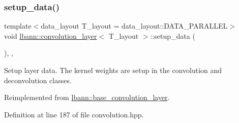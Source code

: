 \subsubsection{\texorpdfstring{setup\+\_\+data()}{setup\_data()}}
{\footnotesize\ttfamily template$<$data\+\_\+layout T\+\_\+layout = data\+\_\+layout\+::\+D\+A\+T\+A\+\_\+\+P\+A\+R\+A\+L\+L\+EL$>$ \\
void \hyperlink{classlbann_1_1convolution__layer}{lbann\+::convolution\+\_\+layer}$<$ T\+\_\+layout $>$\+::setup\+\_\+data (\begin{DoxyParamCaption}{ }\end{DoxyParamCaption})\hspace{0.3cm}{\ttfamily [inline]}, {\ttfamily [override]}, {\ttfamily [virtual]}}

Setup layer data. The kernel weights are setup in the convolution and deconvolution classes. 

Reimplemented from \hyperlink{classlbann_1_1base__convolution__layer_a9f850c1bdf4ae3cd986411d3cb3a524c}{lbann\+::base\+\_\+convolution\+\_\+layer}.



Definition at line 187 of file convolution.\+hpp.


